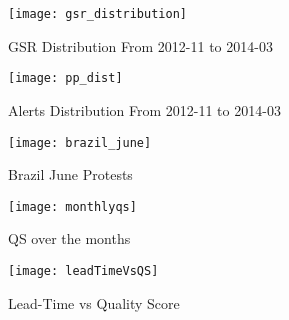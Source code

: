 %


\begin{figure}
    \texttt{[image: gsr\_distribution]}
    \caption{GSR Distribution From 2012-11 to 2014-03}
    \label{fig:gsrdistribution}
\end{figure}

\begin{figure}
    \texttt{[image: pp\_dist]}
    \caption{Alerts Distribution From 2012-11 to 2014-03}
    \label{fig:ppdistribution}
\end{figure}

\begin{figure}
    \texttt{[image: brazil\_june]}
    \caption{Brazil June Protests}
    \label{fig:brazil_june}
\end{figure}

%

\begin{figure}
    \texttt{[image: monthlyqs]}
    \caption{QS over the months}
    \label{fig:monthlyqs}
\end{figure}

\begin{figure}
    \texttt{[image: leadTimeVsQS]}
    \caption{Lead-Time vs Quality Score}
    \label{fig:leadTimeVsQS}
\end{figure}

